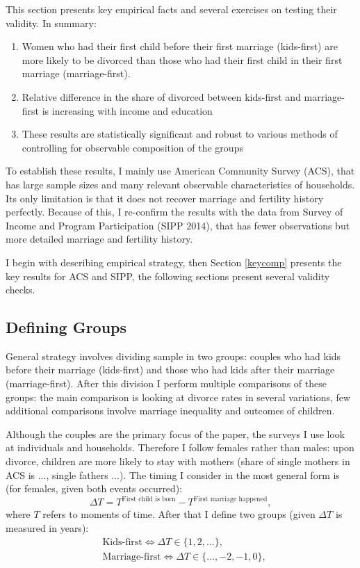 \documentclass[12pt,letter]{article}
\begin{document}
This section presents key empirical facts and several exercises on testing their validity. In summary:
\begin{enumerate}
\item Women who had their first child before their first marriage (kids-first) are more likely to be divorced than those who had their first child in their first marriage (marriage-first).
\item Relative difference in the share of divorced between kids-first and marriage-first is increasing with income and education
\item These results are statistically significant and robust to various methods of controlling for observable composition of the groups
\end{enumerate}

To establish these results, I mainly use American Community Survey (ACS), that has large sample sizes and many relevant observable characteristics of households. Its only limitation is that it does not recover marriage and fertility history perfectly. Because of this, I re-confirm the results with the data from Survey of Income and Program Participation (SIPP 2014), that has fewer observations but more detailed marriage and fertility history.

I begin with describing empirical strategy, then Section \ref{keycomp} presents the key results for ACS and SIPP, the following sections present several validity checks.

\subsection{Defining Groups}

General strategy involves dividing sample in two groups: couples who had kids before their marriage (kids-first) and those who had kids after their marriage (marriage-first). After this division I perform multiple comparisons of these groups: the main comparison is looking at divorce rates in several variations, few additional comparisons involve marriage inequality and outcomes of children.

Although the couples are the primary focus of the paper, the surveys I use look at individuals and households. Therefore I follow females rather than males: upon divorce, children are more likely to stay with mothers (share of single mothers in ACS is ..., single fathers ...). The timing I consider in the  most general form is (for females, given both events occurred): 
\[\Delta T = T^{\text{First child  is born}} - T^{\text{First marriage happened}},\]
where $T$ refers to moments of time. After that I define two groups (given $\Delta T$ is measured in years):
\begin{align*}&\text{Kids-first} \Leftrightarrow \Delta T \in \{1,2,...\},\\
&\text{Marriage-first} \Leftrightarrow \Delta T \in \{...,-2,-1,0\},\end{align*}
\end{document}
